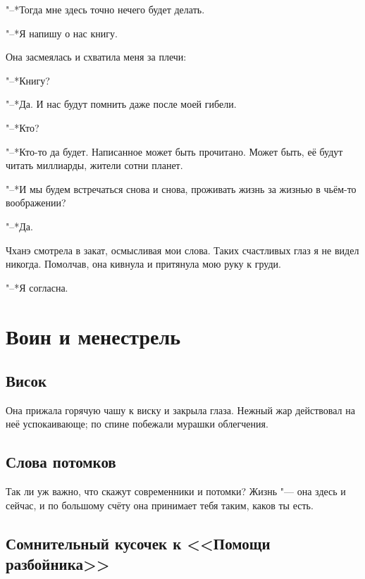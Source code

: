 \documentclass[a4paper,10pt]{book}
\newcommand{\mulang}[3]{#2}%
\begin{document}
"--*Тогда мне здесь точно нечего будет делать.

\mulang{}{"--*Я напишу о нас книгу.}
{``I'll write a book about us.''}

Она засмеялась и схватила меня за плечи:

\mulang{}{"--*Книгу?}
{``A book?''}

\mulang{}{"--*Да.} 
{``Yes.}
\mulang{}{И нас будут помнить даже после моей гибели.}
{We'll be remembered even after my death.''}

\mulang{}{"--*Кто?}
{``But who will remember?''}

\mulang{}{"--*Кто-то да будет.}
{``Somebody will.}
\mulang{}{Написанное может быть прочитано.}
{Written might be read.}
\mulang{}{Может быть, её будут читать миллиарды, жители сотни планет.}
{I guess billions of folk, habitants of hundred planets will read this story.''}

\mulang{}{"--*И мы будем встречаться снова и снова, проживать жизнь за жизнью в 
чьём-то воображении?}
{``And we'll meet and meet again, we'll live life by life in the mind's eye of 
somebody?''}

\mulang{}{"--*Да.}
{``Exactly.''}

Чханэ смотрела в закат, осмысливая мои слова. Таких счастливых глаз я не видел 
никогда. Помолчав, она кивнула и притянула мою руку к груди.

\mulang{}{"--*Я согласна.}
{``I accept it.''}

\chapter{Воин и менестрель}

\section{Висок}

Она прижала горячую чашу к виску и закрыла глаза. Нежный жар действовал на неё успокаивающе; по спине побежали мурашки облегчения.

\section{Слова потомков}

Так ли уж важно, что скажут современники и потомки? Жизнь "--- она здесь и сейчас, и по большому счёту она принимает тебя таким, каков ты есть.

\section{Сомнительный кусочек к <<Помощи разбойника>>}
\end{document}
